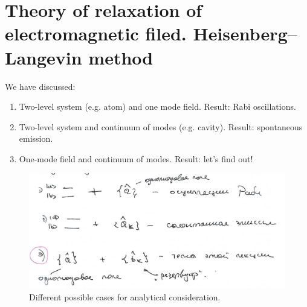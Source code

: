 \section{Theory of relaxation of electromagnetic filed. Heisenberg--Langevin method}

We have discussed:
\begin{enumerate}
	\item Two-level system (e.g. atom) and one mode field. Result: Rabi oscillations.
	\item Two-level system and continuum of modes (e.g. cavity). Result: spontaneous emission.
	\item One-mode field and continuum of modes. Result: let's find out!
\end{enumerate}

\begin{figure}[h!]
	\centering
	\includegraphics[width=0.8\linewidth]{fig/L9/fig1}
	\caption{Different possible cases for analytical consideration.}
	\label{fig:fig11}
\end{figure}


